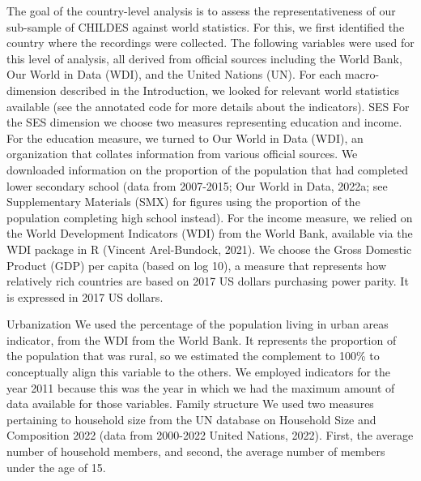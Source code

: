 \documentclass[
]{article}
\begin{document}
The goal of the country-level analysis is to assess the
representativeness of our sub-sample of CHILDES against world
statistics. For this, we first identified the country where the
recordings were collected. The following variables were used for this
level of analysis, all derived from official sources including the World
Bank, Our World in Data (WDI), and the United Nations (UN). For each
macro-dimension described in the Introduction, we looked for relevant
world statistics available (see the annotated code for more details
about the indicators). SES For the SES dimension we choose two measures
representing education and income. For the education measure, we turned
to Our World in Data (WDI), an organization that collates information
from various official sources. We downloaded information on the
proportion of the population that had completed lower secondary school
(data from 2007-2015; Our World in Data, 2022a; see Supplementary
Materials (SMX) for figures using the proportion of the population
completing high school instead). For the income measure, we relied on
the World Development Indicators (WDI) from the World Bank, available
via the WDI package in R (Vincent Arel-Bundock, 2021). We choose the
Gross Domestic Product (GDP) per capita (based on log 10), a measure
that represents how relatively rich countries are based on 2017 US
dollars purchasing power parity. It is expressed in 2017 US dollars.

Urbanization We used the percentage of the population living in urban
areas indicator, from the WDI from the World Bank. It represents the
proportion of the population that was rural, so we estimated the
complement to 100\% to conceptually align this variable to the others.
We employed indicators for the year 2011 because this was the year in
which we had the maximum amount of data available for those variables.
Family structure We used two measures pertaining to household size from
the UN database on Household Size and Composition 2022 (data from
2000-2022 United Nations, 2022). First, the average number of household
members, and second, the average number of members under the age of 15.
\end{document}
